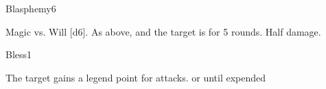 \begin{spellsection}{Blasphemy}{6}
\begin{spellheader}
\end{spellheader}
\begin{spellcontent}
    \begin{spelltargetinginfo}
    \end{spelltargetinginfo}
    \begin{spelleffects}
        \begin{spellattack}{Magic vs. Will}
            \spellsuccess {}[d6].
            \spellcritical As above, and the target is \staggered for 5 rounds.
            \spellfailure Half damage.
        \end{spellattack}
    \end{spelleffects}
\end{spellcontent}
\begin{spellfooter}
\end{spellfooter}
\end{spellsection}

\begin{spellsection}{Bless}{1}
\begin{spellheader}
\end{spellheader}
\begin{spellcontent}
    \begin{spelltargetinginfo}
    \end{spelltargetinginfo}
    \begin{spelleffects}
        \spelleffect The target gains a legend point for attacks.
        \spelldur \durshort or until expended
    \end{spelleffects}
\end{spellcontent}
\begin{spellfooter}
\end{spellfooter}
\end{spellsection}

